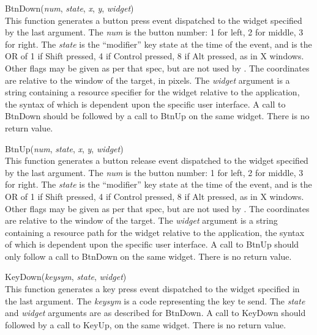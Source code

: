\begin{description}
\item{\vt BtnDown({\it num}, {\it state}, {\it x}, {\it y}, {\it widget\/})}\\
This function generates a button press event dispatched to the widget
specified by the last argument.  The {\it num} is the button number: 
1 for left, 2 for middle, 3 for right.  The {\it state} is the
``modifier'' key state at the time of the event, and is the OR of 1 if
{\kb Shift} pressed, 4 if {\kb Control} pressed, 8 if {\kb Alt}
pressed, as in X windows.  Other flags may be given as per that spec,
but are not used by {\Xic}.  The coordinates are relative to the
window of the target, in pixels.  The {\it widget} argument is a
string containing a resource specifier for the widget relative to the
application, the syntax of which is dependent upon the specific user
interface.  A call to {\vt BtnDown} should be followed by a call to
{\vt BtnUp} on the same widget.  There is no return value.

\item{\vt BtnUp({\it num}, {\it state}, {\it x}, {\it y}, {\it widget\/})}\\
This function generates a button release event dispatched to the
widget specified by the last argument.  The {\it num} is the button
number:  1 for left, 2 for middle, 3 for right.  The {\it state} is
the ``modifier'' key state at the time of the event, and is the OR of
1 if {\kb Shift} pressed, 4 if {\kb Control} pressed, 8 if {\kb Alt}
pressed, as in X windows.  Other flags may be given as per that spec,
but are not used by {\Xic}.  The coordinates are relative to the
window of the target.  The {\it widget} argument is a string
containing a resource path for the widget relative to the application,
the syntax of which is dependent upon the specific user interface.  A
call to {\vt BtnUp} should only follow a call to {\vt BtnDown} on the
same widget.  There is no return value.

\item{\vt KeyDown({\it keysym}, {\it state}, {\it widget\/})}\\
This function generates a key press event dispatched to the widget
specified in the last argument.  The {\it keysym\/} is a code
representing the key te send.  The {\it state} and {\it widget}
arguments are as described for {\vt BtnDown}.  A call to {\vt KeyDown}
should followed by a call to {\vt KeyUp}, on the same widget.  There
is no return value.


\end{description}
